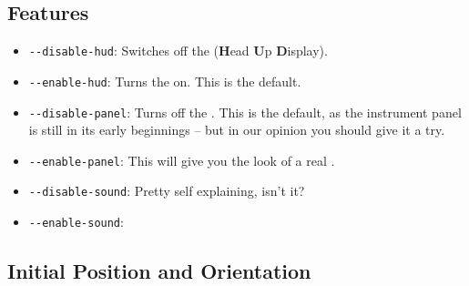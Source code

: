 \subsection{Features}

\begin{itemize}

\item{\texttt{-$\!$-disable-hud}}: Switches off the  (\textbf{H}ead \textbf{U}p
  \textbf{D}isplay).

\item{\texttt{-$\!$-enable-hud}}: Turns the   on. This is the default.

\item{\texttt{-$\!$-disable-panel}}: Turns off the . This is the
  default, as the instrument panel is still in its early beginnings -- but in our opinion
  you should give it a try.

\item{\texttt{-$\!$-enable-panel}}: This will give you the look of a real .

\item{\texttt{-$\!$-disable-sound}}: Pretty self explaining, isn't it?

\item{\texttt{-$\!$-enable-sound}}:

\end{itemize}

\subsection{Initial Position and Orientation}

